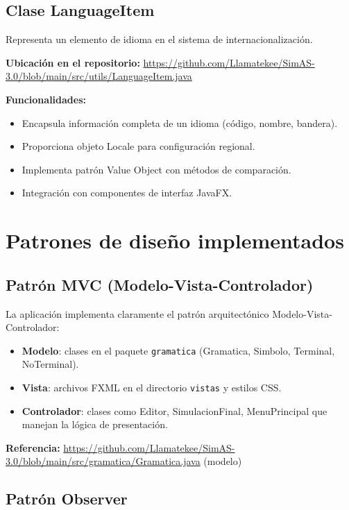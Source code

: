 \subsection{Clase LanguageItem}

Representa un elemento de idioma en el sistema de internacionalización.

\textbf{Ubicación en el repositorio:} \url{https://github.com/Llamatekee/SimAS-3.0/blob/main/src/utils/LanguageItem.java}

\textbf{Funcionalidades:}
\begin{itemize}
    \item Encapsula información completa de un idioma (código, nombre, bandera).
    \item Proporciona objeto Locale para configuración regional.
    \item Implementa patrón Value Object con métodos de comparación.
    \item Integración con componentes de interfaz JavaFX.
\end{itemize}

\section{Patrones de diseño implementados}

\subsection{Patrón MVC (Modelo-Vista-Controlador)}

La aplicación implementa claramente el patrón arquitectónico Modelo-Vista-Controlador:

\begin{itemize}
    \item \textbf{Modelo}: clases en el paquete \texttt{gramatica} (Gramatica, Simbolo, Terminal, NoTerminal).
    \item \textbf{Vista}: archivos FXML en el directorio \texttt{vistas} y estilos CSS.
    \item \textbf{Controlador}: clases como Editor, SimulacionFinal, MenuPrincipal que manejan la lógica de presentación.
\end{itemize}

\textbf{Referencia:} \url{https://github.com/Llamatekee/SimAS-3.0/blob/main/src/gramatica/Gramatica.java} (modelo)

\subsection{Patrón Observer}

